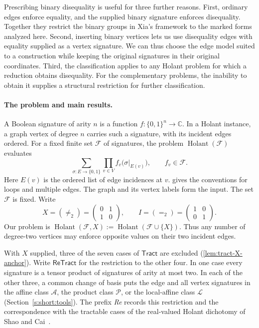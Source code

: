 \documentclass[11pt,letterpaper,onecolumn]{article}
\theoremstyle{plain}
\theoremstyle{definition}
\theoremstyle{remark}
\newcommand{\cF}{\mathcal F}
\newcommand{\cA}{\mathscr A}
\newcommand{\cP}{\mathscr P}
\newcommand{\cL}{\mathscr L}
\newcommand{\Holant}{\operatorname{Holant}}
\newcommand{\Tract}{\mathsf{Tract}}
\newcommand{\ReTract}{\mathsf{ReTract}}
\newcommand{\Eq}{=}
\newcommand{\Neq}{\neq}
\begin{document}
Prescribing binary disequality is useful for three further reasons.
First, ordinary edges enforce equality, and the supplied binary
signature enforces disequality. Together they restrict the binary groups
in Xia's framework \cite[Section~4 and Table~2]{Xia2026FrameworkV1} to
the marked forms analyzed here. Second, inserting binary vertices lets
us use disequality edges with equality supplied as a vertex signature.
We can thus choose the edge model suited to a construction while keeping
the original signatures in their original coordinates. Third, the classification applies to any Holant problem for which
a reduction obtains disequality. For the complementary problems, the
inability to obtain it supplies a structural restriction for further
classification.

\paragraph{The problem and main results.}
A Boolean signature of arity \(n\) is a function
\(f:\{0,1\}^n\to\mathbb C\).  In a Holant instance, a graph vertex
of degree \(n\) carries such a signature, with its incident edges ordered.
For a fixed finite set \(\cF\) of signatures, the problem
\(\Holant(\cF)\) evaluates
\[
  \sum_{\sigma:E\to\{0,1\}}
  \prod_{v\in V}f_v\bigl(\sigma|_{E(v)}\bigr),
  \qquad f_v\in\cF.
\]
Here \(E(v)\) is the ordered list of edge incidences at \(v\).
 gives the conventions for loops and
multiple edges.  The graph and its vertex labels form the input. The set
\(\cF\) is fixed.  Write
\[
 X=(\Neq_2)=\begin{pmatrix}0&1\\1&0\end{pmatrix},
 \qquad I=(\Eq_2)=\begin{pmatrix}1&0\\0&1\end{pmatrix}.
\]
Our problem is \(\Holant(\cF,X):=\Holant(\cF\cup\{X\})\).
Thus any number of degree-two vertices may enforce opposite values on
their two incident edges.

With \(X\) supplied, three of the seven cases of \(\Tract\) are
excluded (\cref{lem:tract-X-anchor}). Write \(\ReTract\)
for the restriction to the other four. In one case every signature is a
tensor product of signatures of arity at most two. In each of the other
three, a common change of basis puts the edge and all vertex signatures
in the affine class \(\cA\), the product class \(\cP\), or the local-affine
class \(\cL\) (Section~\ref{s:short:tools}). The prefix \emph{Re} records this
restriction and the correspondence with the tractable cases of the
real-valued Holant dichotomy of Shao and Cai~\cite{ShaoCai2020}.
\end{document}
